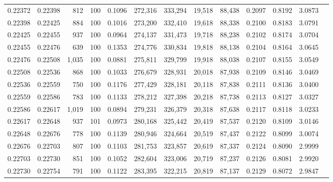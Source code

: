 \begin{tabular}{rrrrrrrrrrrrr}
0.22372 & 0.22398 &   812 & 100 &                                     0.1096 & 272,316 & 333,294 &  19,518 &  88,438 & 0.2097 & 0.8192 & 3.0873 \\
0.22398 & 0.22425 &   884 & 100 &                                     0.1016 & 273,200 & 332,410 &  19,618 &  88,338 & 0.2100 & 0.8183 & 3.0791 \\
0.22425 & 0.22455 &   937 & 100 &                                     0.0964 & 274,137 & 331,473 &  19,718 &  88,238 & 0.2102 & 0.8174 & 3.0704 \\
0.22455 & 0.22476 &   639 & 100 &                                     0.1353 & 274,776 & 330,834 &  19,818 &  88,138 & 0.2104 & 0.8164 & 3.0645 \\
0.22476 & 0.22508 & 1,035 & 100 &                                     0.0881 & 275,811 & 329,799 &  19,918 &  88,038 & 0.2107 & 0.8155 & 3.0549 \\
0.22508 & 0.22536 &   868 & 100 &                                     0.1033 & 276,679 & 328,931 &  20,018 &  87,938 & 0.2109 & 0.8146 & 3.0469 \\
0.22536 & 0.22559 &   750 & 100 &                                     0.1176 & 277,429 & 328,181 &  20,118 &  87,838 & 0.2111 & 0.8136 & 3.0400 \\
0.22559 & 0.22586 &   783 & 100 &                                     0.1133 & 278,212 & 327,398 &  20,218 &  87,738 & 0.2113 & 0.8127 & 3.0327 \\
0.22586 & 0.22617 & 1,019 & 100 &                                     0.0894 & 279,231 & 326,379 &  20,318 &  87,638 & 0.2117 & 0.8118 & 3.0233 \\
0.22617 & 0.22648 &   937 & 101 &                                     0.0973 & 280,168 & 325,442 &  20,419 &  87,537 & 0.2120 & 0.8109 & 3.0146 \\
0.22648 & 0.22676 &   778 & 100 &                                     0.1139 & 280,946 & 324,664 &  20,519 &  87,437 & 0.2122 & 0.8099 & 3.0074 \\
0.22676 & 0.22703 &   807 & 100 &                                     0.1103 & 281,753 & 323,857 &  20,619 &  87,337 & 0.2124 & 0.8090 & 2.9999 \\
0.22703 & 0.22730 &   851 & 100 &                                     0.1052 & 282,604 & 323,006 &  20,719 &  87,237 & 0.2126 & 0.8081 & 2.9920 \\
0.22730 & 0.22754 &   791 & 100 &                                     0.1122 & 283,395 & 322,215 &  20,819 &  87,137 & 0.2129 & 0.8072 & 2.9847 \\

\end{tabular}
